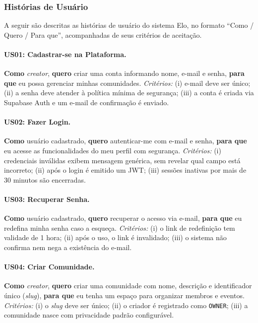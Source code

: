 \documentclass[12pt, a4paper]{article}
\begin{document}
\subsubsection{Histórias de Usuário}

A seguir são descritas as histórias de usuário do sistema Elo, no formato
``Como / Quero / Para que'', acompanhadas de seus critérios de aceitação.

\paragraph{US01: Cadastrar-se na Plataforma.}
\textbf{Como} \textit{creator}, \textbf{quero} criar uma conta informando nome,
e-mail e senha, \textbf{para que} eu possa gerenciar minhas comunidades.
\textit{Critérios:} (i) e-mail deve ser único; (ii) a senha deve atender à
política mínima de segurança; (iii) a conta é criada via Supabase Auth e um
e-mail de confirmação é enviado.

\paragraph{US02: Fazer Login.}
\textbf{Como} usuário cadastrado, \textbf{quero} autenticar-me com e-mail e
senha, \textbf{para que} eu acesse as funcionalidades do meu perfil com
segurança. \textit{Critérios:} (i) credenciais inválidas exibem mensagem
genérica, sem revelar qual campo está incorreto; (ii) após o login é emitido um
JWT; (iii) sessões inativas por mais de 30 minutos são encerradas.

\paragraph{US03: Recuperar Senha.}
\textbf{Como} usuário cadastrado, \textbf{quero} recuperar o acesso via e-mail,
\textbf{para que} eu redefina minha senha caso a esqueça. \textit{Critérios:}
(i) o link de redefinição tem validade de 1 hora; (ii) após o uso, o link é
invalidado; (iii) o sistema não confirma nem nega a existência do e-mail.

\paragraph{US04: Criar Comunidade.}
\textbf{Como} \textit{creator}, \textbf{quero} criar uma comunidade com nome,
descrição e identificador único (\textit{slug}), \textbf{para que} eu tenha um
espaço para organizar membros e eventos. \textit{Critérios:} (i) o \textit{slug}
deve ser único; (ii) o criador é registrado como \texttt{OWNER}; (iii) a
comunidade nasce com privacidade padrão configurável.
\end{document}

